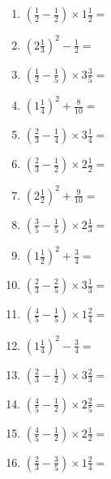 \documentclass[12pt]{article}
\begin{document}
\begin{enumerate}
\item \large $ \left( \frac{1}{2} - \frac{1}{2} \right) \times 1 \frac{1}{2} = $ \vspace{1.6cm}
\item \large $ \left( 2 \frac{1}{3} \right)^2 - \frac{1}{2} = $ \vspace{1.6cm}
\item \large $ \left( \frac{1}{2} - \frac{1}{5} \right) \times 3 \frac{3}{5} = $ \vspace{1.6cm}
\item \large $ \left( 1 \frac{1}{4} \right)^2 + \frac{8}{10} = $ \vspace{1.6cm}
\item \large $ \left( \frac{2}{3} - \frac{1}{4} \right) \times 3 \frac{1}{4} = $ \vspace{1.6cm}
\item \large $ \left( \frac{2}{3} - \frac{1}{2} \right) \times 2 \frac{1}{2} = $ \vspace{1.6cm}
\newpage
\item \large $ \left( 2 \frac{1}{2} \right)^2 + \frac{9}{10} = $ \vspace{1.6cm}
\item \large $ \left( \frac{3}{5} - \frac{1}{5} \right) \times 2 \frac{1}{3} = $ \vspace{1.6cm}
\item \large $ \left( 1 \frac{1}{2} \right)^2 + \frac{3}{4} = $ \vspace{1.6cm}
\item \large $ \left( \frac{2}{3} - \frac{2}{5} \right) \times 3 \frac{1}{3} = $ \vspace{1.6cm}
\item \large $ \left( \frac{4}{5} - \frac{1}{5} \right) \times 1 \frac{2}{4} = $ \vspace{1.6cm}
\item \large $ \left( 1 \frac{1}{4} \right)^2 - \frac{3}{4} = $ \vspace{1.6cm}
\item \large $ \left( \frac{2}{3} - \frac{1}{2} \right) \times 3 \frac{2}{3} = $ \vspace{1.6cm}
\item \large $ \left( \frac{4}{5} - \frac{1}{2} \right) \times 2 \frac{2}{5} = $ \vspace{1.6cm}
\item \large $ \left( \frac{4}{5} - \frac{1}{2} \right) \times 2 \frac{1}{2} = $ \vspace{1.6cm}
\item \large $ \left( \frac{2}{3} - \frac{3}{5} \right) \times 1 \frac{2}{4} = $ \vspace{1.6cm}

\end{enumerate}
\end{document}
